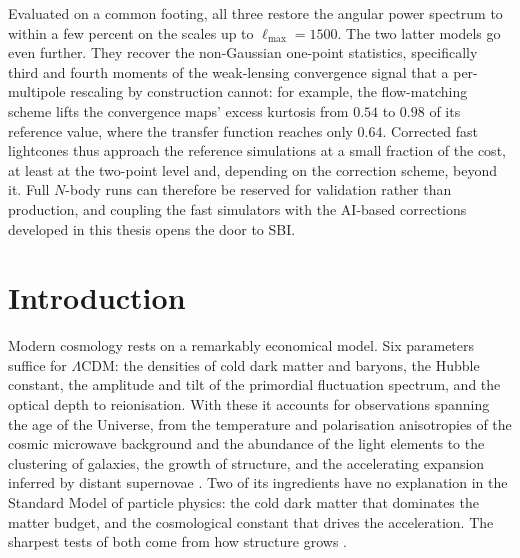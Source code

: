 \documentclass{report}
\begin{document}
Evaluated on a common footing, all three restore the angular power spectrum to within a few percent on the scales up to \mbox{$\ell_{\max} = 1500$}. The two latter models go even further. They recover the non-Gaussian one-point statistics, specifically third and fourth moments of the weak-lensing convergence signal that a per-multipole rescaling by construction cannot: for example, the flow-matching scheme lifts the convergence maps' excess kurtosis from \mbox{$0.54$} to \mbox{$0.98$} of its reference value, where the transfer function reaches only \mbox{$0.64$}. Corrected fast lightcones thus approach the reference simulations at a small fraction of the cost, at least at the two-point level and, depending on the correction scheme, beyond it. Full \mbox{$N$}-body runs can therefore be reserved for validation rather than production, and coupling the fast simulators with the AI-based corrections developed in this thesis opens the door to SBI.

\tableofcontents

\chapter{Introduction}
\label{ch:introduction}

Modern cosmology rests on a remarkably economical model. Six parameters suffice for \mbox{$\Lambda$}CDM: the densities of cold dark matter and baryons, the Hubble constant, the amplitude and tilt of the primordial fluctuation spectrum, and the optical depth to reionisation. With these it accounts for observations spanning the age of the Universe, from the temperature and polarisation anisotropies of the cosmic microwave background and the abundance of the light elements to the clustering of galaxies, the growth of structure, and the accelerating expansion inferred by distant supernovae \cite{dodelson_modern_2020}. Two of its ingredients have no explanation in the Standard Model of particle physics: the cold dark matter that dominates the matter budget, and the cosmological constant that drives the acceleration. The sharpest tests of both come from how structure grows \cite{huterer_growth_2023}.
\end{document}

